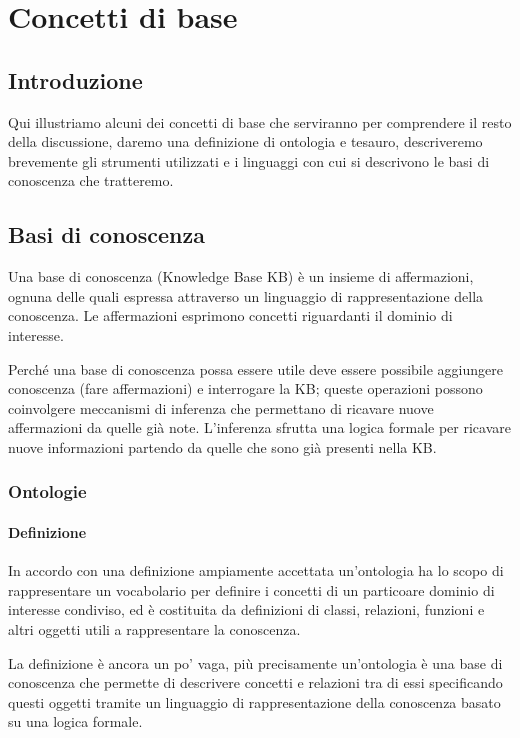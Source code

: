 \chapter{Concetti di base}

\section*{Introduzione}
Qui illustriamo alcuni dei concetti di base che serviranno per comprendere il resto della discussione, daremo una definizione di ontologia e tesauro, descriveremo brevemente gli strumenti utilizzati e i linguaggi con cui si descrivono le basi di conoscenza che tratteremo.


\section{Basi di conoscenza}
Una base di conoscenza (Knowledge Base KB) è un insieme di affermazioni, ognuna delle quali espressa attraverso un linguaggio di rappresentazione della conoscenza. Le affermazioni esprimono concetti riguardanti il dominio di interesse.

Perché una base di conoscenza possa essere utile deve essere possibile aggiungere conoscenza (fare affermazioni) e interrogare la KB; queste operazioni possono coinvolgere meccanismi di inferenza che permettano di ricavare nuove affermazioni da quelle già note. L'inferenza sfrutta una logica formale per ricavare nuove informazioni partendo da quelle che sono già presenti nella KB.\cite{russell2010artificial}
\subsection{Ontologie}
\subsubsection{Definizione}
In accordo con una definizione ampiamente accettata \cite{hitzler2021review} un'ontologia ha lo scopo di rappresentare un vocabolario per definire i concetti di un particoare dominio di interesse condiviso, ed è costituita da definizioni di classi, relazioni, funzioni e altri oggetti utili a rappresentare la conoscenza\cite{gruber1993translation}. 

La definizione è ancora un po' vaga, più precisamente un'ontologia è una base di conoscenza che permette di descrivere concetti e relazioni tra di essi specificando questi oggetti tramite un linguaggio di rappresentazione della conoscenza basato su una logica formale.

